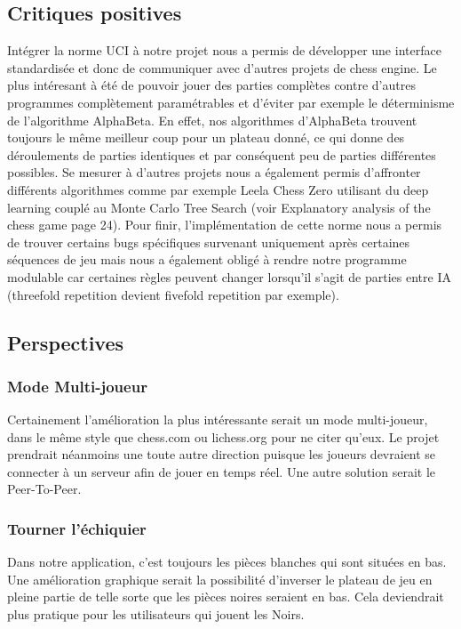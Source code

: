 \documentclass{article}
\begin{document}
\subsection{Critiques positives}
Intégrer la norme UCI à notre projet nous a permis de développer une interface standardisée et donc de communiquer avec d'autres projets de chess engine.
Le plus intéresant à été de pouvoir jouer des parties complètes contre d'autres programmes complètement paramétrables et d'éviter par exemple le déterminisme
de l'algorithme AlphaBeta. En effet, nos algorithmes d'AlphaBeta trouvent toujours le même meilleur coup pour un plateau donné, ce qui donne des déroulements de parties
identiques et par conséquent peu de parties différentes possibles. Se mesurer à d'autres projets nous a également permis d'affronter différents algorithmes comme par exemple
Leela Chess Zero utilisant du deep learning couplé au Monte Carlo Tree Search (voir Explanatory analysis of the chess game \cite{GameEngine} page 24).
Pour finir, l'implémentation de cette norme nous a permis de trouver certains bugs spécifiques survenant uniquement après certaines séquences de jeu mais nous a également
obligé à rendre notre programme modulable car certaines règles peuvent changer lorsqu'il s'agit de parties entre IA (threefold repetition devient fivefold repetition par exemple).

\subsection{Perspectives}
\subsubsection{Mode Multi-joueur}
Certainement l'amélioration la plus intéressante serait un mode multi-joueur, dans le même style que chess.com ou lichess.org pour ne citer qu'eux.
Le projet prendrait néanmoins une toute autre direction puisque les joueurs devraient se connecter à un serveur afin de jouer en temps réel. Une
autre solution serait le Peer-To-Peer.

\subsubsection{Tourner l'échiquier}
Dans notre application, c'est toujours les pièces blanches qui sont situées en bas. Une amélioration graphique serait la possibilité d'inverser le plateau
de jeu en pleine partie de telle sorte que les pièces noires seraient en bas. Cela deviendrait plus pratique pour les utilisateurs qui jouent les Noirs.
\end{document}
